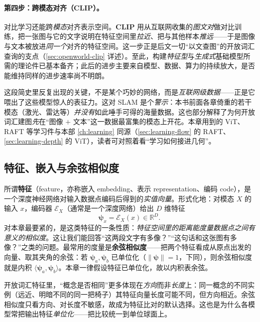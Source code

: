 \paragraph{第四步：跨模态对齐（CLIP）。}
对比学习还能跨\emph{模态}对齐表示空间。\textbf{CLIP}\cite{radford2021clip} 用从互联网收集的\emph{图文对}做对比训练，把一张图与它的文字说明在特征空间里\emph{拉近}、把与其他样本\emph{推远}——于是图像与文本被放进\emph{同一个}对齐的特征空间。这一步正是后文一切“以文查图”的开放词汇查询的支点（\cref{sec:openworld-clip} 详述）。至此，构建\emph{特征型}与\emph{生成式}基础模型所需的理论件已基本备齐；此后的进步主要来自模型、数据、算力的持续放大，是否能维持同样的进步速率尚不明朗。

\begin{note}
这段简史里反复出现的关键，不是某个巧妙的网络，而是\emph{互联网级数据}——正是它喂出了这些模型惊人的表征力。这对 SLAM 是个\emph{警示}：本书前面各章倚重的若干模态（激光、雷达等）\emph{并没有}如此唾手可得的海量数据\cite{paull2026openworld}。这也部分解释了为何开放词汇建图\emph{先}在“图像 $+$ 文本”这一数据最富集的模态上开花。本章用到的 ViT、RAFT 等学习件与本部 \cref{ch:learning} 同源（\cref{sec:learning-flow} 的 RAFT、\cref{sec:learning-depth} 的 ViT），读者可对照着看“学习如何接进几何”。
\end{note}

\subsection{特征、嵌入与余弦相似度}
\label{sec:openworld-feature}

所谓\textbf{特征}（feature，亦称嵌入 embedding、表示 representation、编码 code），是一个深度神经网络对输入数据点编码后得到的\emph{实值向量}\cite{paull2026openworld}。形式化地：对模态 $X$ 的输入 $x$，编码器 $\mathcal{E}_X$（通常是一个深度网络）给出 $D$ 维特征
\begin{equation}
  \boldsymbol\psi_x=\mathcal{E}_X(x)\in\mathbb{R}^{D}.
  \label{eq:ow-encoder}
\end{equation}
对本章最要紧的，是这类特征的一条性质：\emph{特征空间里的距离能度量数据点之间有意义的相似度}。这让我们能回答“这两段文字有多像？”“这句话和这张图有多像？”之类的问题。最常用的度量是\textbf{余弦相似度}——把两个特征看成从原点出发的向量、取其夹角的余弦：若 $\boldsymbol\psi_a,\boldsymbol\psi_b$ 已单位化（$\|\boldsymbol\psi\|=1$，下同），则余弦相似度就是内积 $\langle\boldsymbol\psi_a,\boldsymbol\psi_b\rangle$。本章一律假设特征已单位化，故以内积表余弦。

\begin{note}[为什么是余弦而非欧氏距离]
开放词汇特征里，“概念是否相同”更多体现在\emph{方向}而非\emph{长度}上：同一概念的不同实例（远近、明暗不同的同一把椅子）其特征向量长度可能不同，但方向相近。余弦相似度只看方向、对长度不敏感，故成为特征比对的默认选择。这也是为什么各模型常把输出特征\emph{单位化}——把比较统一到单位球面上。
\end{note}

